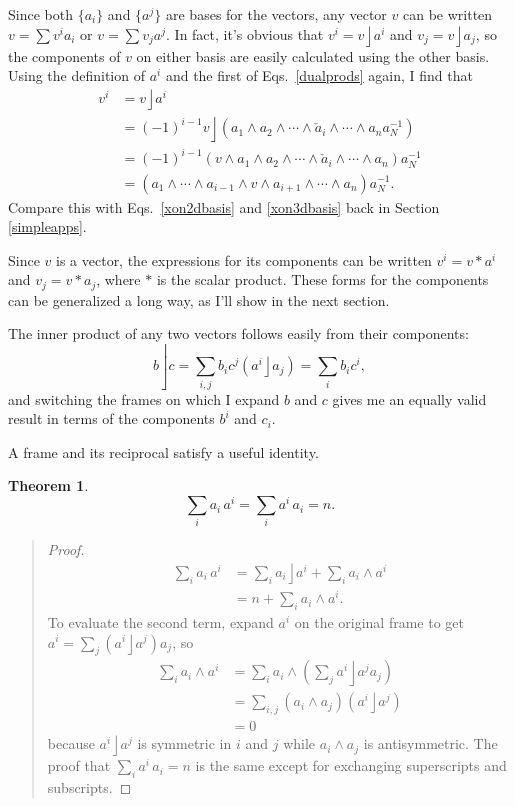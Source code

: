 \documentclass{utarticle}
\DeclareMathOperator{\lin}{\rfloor}
\DeclareMathOperator{\out}{\wedge}
\newcommand{\scprod}[2]{\ensuremath{#1 * #2}}
\newtheorem{thm}{Theorem}
\newcommand{\bp}{\begin{quotation} \begin{proof}}
\newcommand{\ep}{\end{proof} \end{quotation}}
\begin{document}
Since both $\{a_i\}$ and $\{a^j\}$ are bases for the vectors, any
vector $v$ can be written $v=\sum v^i a_i$ or $v=\sum v_j a^j$.  In
fact, it's obvious that $v^i=v \lin a^i$ and $v_j = v \lin a_j $, so
the components of $v$ on either basis are easily calculated using the
other basis.  Using the definition of $a^i$ and the first of 
Eqs.~\eqref{dualprods} again, I find that
\begin{align}
v^i & = v \lin a^i \nonumber \\
 & = (-1)^{i-1} v \lin (a_1 \out a_2 \out \dotsb \out 
    \check{a}_i \out \dotsb \out a_n a_N^{-1}) \nonumber \\
 & = (-1)^{i-1} (v \out a_1 \out a_2 \out \dotsb \out 
    \check{a}_i \out \dotsb \out a_n) a_N^{-1} \nonumber \\
 & = (a_1 \out \dotsb \out a_{i-1} \out v \out a_{i+1}
    \out \dotsb \out a_n) a_N^{-1}.
\end{align}
Compare this with Eqs.~\eqref{xon2dbasis} and \eqref{xon3dbasis} back in 
Section \ref{simpleapps}.

Since $v$ is a vector, the expressions for its components can be
written $v^i=\scprod{v}{a^i}$ and $v_j=\scprod{v}{a_j}$, where $\scprod{}{}$ 
is the scalar product.  These forms for the components can be generalized 
a long way, as I'll show in the next section.

The inner product of any two vectors follows easily from their
components:
\begin{equation} 
b \lin c = \sum_{i,j} b_i c^j (a^i \lin a_j) = \sum_i b_i  c^i, 
\label{inpuvcomps}
\end{equation}
and switching the frames on which I expand $b$ and $c$ gives me an 
equally valid result in terms of the components $b^i$ and $c_i$.

A frame and its reciprocal satisfy a useful identity.
\begin{thm}
\begin{equation} \sum_i a_i\,a^i = \sum_i a^i\,a_i = n. \end{equation}
\label{aiaieqn}
\end{thm}
\bp
\begin{align} 
\sum_i a_i \, a^i & = \sum_i a_i \lin a^i + \sum_i a_i \out a^i \nonumber \\
                             & = n + \sum_i a_i \out a^i. 
\end{align}
To evaluate the second term, expand $a^i$ on the original frame to get 
$a^i = \sum_j (a^i \lin a^j) a_j$, so
\begin{align}
\sum_i a_i \out a^i & = \sum_i a_i \out \left( \sum_j a^i \lin a^j a_j \right) \nonumber \\
                                  & = \sum_{i, j} (a_i \out a_j) (a^i \lin a^j) \nonumber \\
                                  & = 0
\end{align}
because $a^i \lin a^j$ is symmetric in $i$ and $j$ while $a_i \out a_j$ is antisymmetric.
The proof that $\sum_i a^i \, a_i = n$ is the same except for exchanging superscripts 
and subscripts.
\ep
\end{document}
